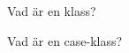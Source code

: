 
\ifkompendium\else


\begin{Slide}{Vad är en klass?}
\end{Slide}


\begin{Slide}{Vad är en case-klass?}
\end{Slide}


\fi




